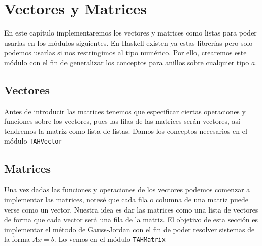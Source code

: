 \chapter{Vectores y Matrices}\label{sec:matrixHas}
En este capítulo implementaremos los vectores y matrices como listas para poder usarlas en los módulos siguientes. En Haskell existen ya estas librerías pero solo podemos usarlas si nos restringimos al tipo numérico. Por ello, crearemos este módulo con el fin de generalizar los conceptos para anillos sobre cualquier tipo $a$.

\section{Vectores}
Antes de introducir las matrices tenemos que especificar ciertas operaciones y funciones sobre los vectores, pues las filas de las matrices serán vectores, así tendremos la matriz como lista de listas. Damos los conceptos necesarios en el módulo \texttt{TAHVector} 

\section{Matrices}
Una vez dadas las funciones y operaciones de los vectores podemos comenzar a implementar las matrices, notesé que cada fila o columna de una matriz puede verse como un vector. Nuestra idea es dar las matrices como una lista de vectores de forma que cada vector será una fila de la matriz. El objetivo de esta sección es implementar el método de Gauss-Jordan con el fin de poder resolver sistemas de la forma $Ax=b$. Lo vemos en el módulo \texttt{TAHMatrix} 